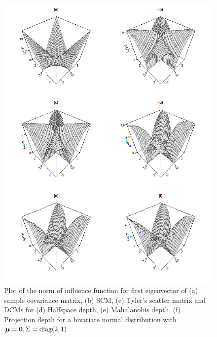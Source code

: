 \begin{figure}[]
	\centering
		\includegraphics[width=12cm]{../Codes/IFnorm.png}
	\caption{Plot of the norm of influence function for first eigenvector of (a) sample covariance matrix, (b) SCM, (c) Tyler's scatter matrix and DCMs for (d) Halfspace depth, (e) Mahalanobis depth, (f) Projection depth for a bivariate normal distribution with ${\boldsymbol{\mu}} = {\bf 0}, \Sigma = \operatorname*{diag}(2,1)$}
	\label{fig:IFnorm}
\end{figure}

